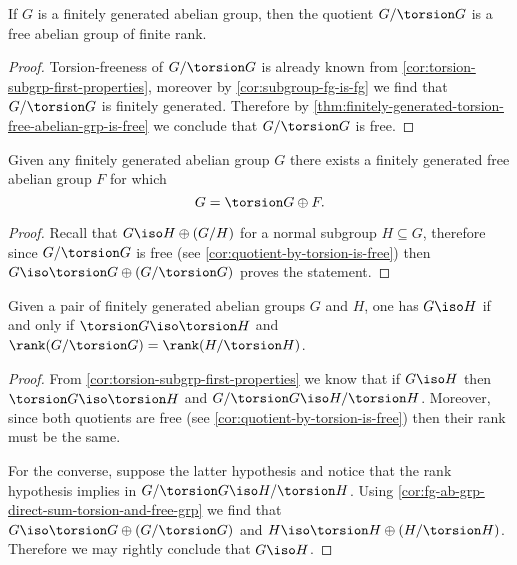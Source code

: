 \begin{corollary}
\label{cor:quotient-by-torsion-is-free}
If \(G\) is a finitely generated abelian group, then the quotient
\(G/\torsion G\) is a free abelian group of finite rank.
\end{corollary}

\begin{proof}
Torsion-freeness of \(G/\torsion G\) is already known from
\cref{cor:torsion-subgrp-first-properties}, moreover by
\cref{cor:subgroup-fg-is-fg} we find that \(G/\torsion G\) is finitely
generated. Therefore by
\cref{thm:finitely-generated-torsion-free-abelian-grp-is-free} we conclude that
\(G/\torsion G\) is free.
\end{proof}

\begin{corollary}
\label{cor:fg-ab-grp-direct-sum-torsion-and-free-grp}
Given any finitely generated abelian group \(G\) there exists a finitely
generated free abelian group \(F\) for which
\[
G = \torsion G \oplus F.
\]
\end{corollary}

\begin{proof}
Recall that \(G \iso H \oplus (G/H)\) for a normal subgroup \(H \subseteq G\),
therefore since \(G/\torsion G\) is free (see
\cref{cor:quotient-by-torsion-is-free}) then
\(G \iso \torsion G \oplus (G/\torsion G)\) proves the statement.
\end{proof}

\begin{corollary}
\label{cor:iso-fg-grps-iff-torsions-and-rank}
Given a pair of finitely generated abelian groups \(G\) and \(H\), one has
\(G \iso H\) if and only if \(\torsion G \iso \torsion H\) and
\(\rank(G/\torsion G) = \rank(H/\torsion H)\).
\end{corollary}

\begin{proof}
From \cref{cor:torsion-subgrp-first-properties} we know that if \(G \iso H\)
then \(\torsion G \iso \torsion H\) and \(G/\torsion G \iso H/\torsion
H\). Moreover, since both quotients are free (see
\cref{cor:quotient-by-torsion-is-free}) then their rank must be the same.

For the converse, suppose the latter hypothesis and notice that the rank
hypothesis implies in \(G/\torsion G \iso H/\torsion H\). Using
\cref{cor:fg-ab-grp-direct-sum-torsion-and-free-grp} we find that
\(G \iso \torsion G \oplus (G/\torsion G)\) and
\(H \iso \torsion H \oplus (H/\torsion H)\). Therefore we may rightly conclude
that \(G \iso H\).
\end{proof}

